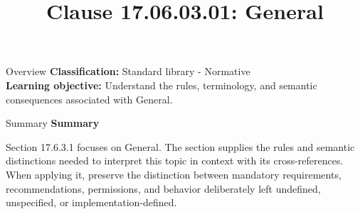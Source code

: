 \documentclass[10pt,letterpaper]{article}
\title{Clause 17.06.03.01: General}
\author{}
\date{}
\begin{document}
\maketitle
\begin{CornellOverviewBox}{Overview}
\textbf{Classification:} Standard library - Normative\\[2pt]
\textbf{Learning objective:} Understand the rules, terminology, and semantic consequences associated with General.
\end{CornellOverviewBox}\begin{CornellSummaryBox}{Summary}
{\sffamily\bfseries\color{Accent} Summary}\par\vspace{3pt}Section 17.6.3.1 focuses on General. The section supplies the rules and semantic distinctions needed to interpret this topic in context with its cross-references. When applying it, preserve the distinction between mandatory requirements, recommendations, permissions, and behavior deliberately left undefined, unspecified, or implementation-defined.
\end{CornellSummaryBox}
\end{document}
